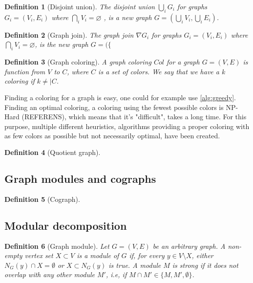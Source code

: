 \documentclass{amsart}
\newtheorem{definition}{Definition}[section]
\begin{document}
\begin{definition}[Disjoint union]
    The disjoint union $\bigcup_i G_i$ for graphs $G_i = (V_i,E_i)$ where 
    $\bigcap_i V_i = \varnothing $ , is a new graph
    $G = \left( \bigcup_i V_i,\bigcup_i E_i \right)$.
\end{definition}

\begin{definition}[Graph join]
    The graph join $\nabla G_i$ for graphs $G_i = (V_i,E_i)$ where 
    $\bigcap_i V_i = \varnothing$, is the new graph $G = (\{ $
\end{definition}


\begin{definition}[Graph coloring]
    A graph coloring $Col$ for a graph $G = (V,E)$
    is function from $V$ to $C$, where $C$ is a set of colors. We say that 
    we have a $k$ coloring if $k \neq |C$.
\end{definition}

Finding a coloring for a graph is easy, one could for example use 
\autoref{alg:greedy}. Finding an optimal coloring, a coloring using the fewest
possible colors is NP-Hard (REFERENS), which means that it's "difficult", takes
a long time. For this purpose, multiple different heuristics, algorithms
providing a proper coloring with as few colors as possible but not necessarily
optimal, have been created.

\begin{definition}[Quotient graph]

\end{definition}

\subsection{Graph modules and cographs}
\label{sec:GraphModules}

\begin{definition}[Cograph]
    
\end{definition}

\subsection{Modular decomposition}

\begin{definition}[Graph module]
    Let $G = (V,E)$ be an arbitrary graph. A non-empty vertex set $X \subset V$
    is a module of $G$ if, for every $y \in V \setminus X$,  either
    $N_G(y) \cap X = \emptyset$ or $X \subset N_G(y)$ is true. A module $M$ is
    strong if it does not overlap with any other module $M'$, i.e, if 
    $M \cap M' \in \{M,M',\emptyset \}$.
\end{definition}
   
\end{document}
